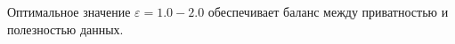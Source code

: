 
Оптимальное значение $\varepsilon = 1.0{-}2.0$ обеспечивает баланс между приватностью и полезностью данных.






